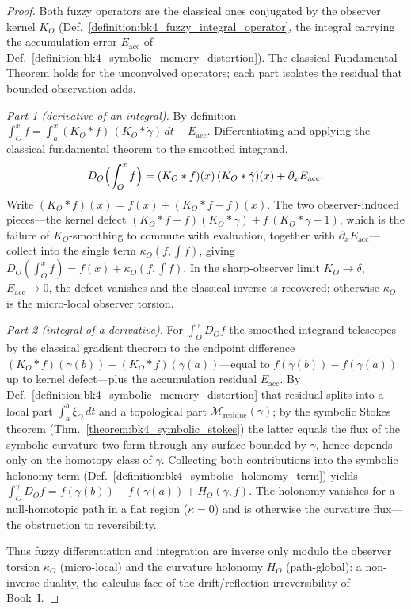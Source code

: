 \begin{proof}
\label{proof:bk4_fuzzy_fundamental}
\leavevmode
Both fuzzy operators are the classical ones conjugated by the observer kernel $K_O$ (Def.~\ref{definition:bk4_fuzzy_integral_operator}, the integral carrying the accumulation error $E_{\text{acc}}$ of Def.~\ref{definition:bk4_symbolic_memory_distortion}). The classical Fundamental Theorem holds for the unconvolved operators; each part isolates the residual that bounded observation adds.

\emph{Part 1 (derivative of an integral).} By definition $\int_O^x f = \int_a^x (K_O*f)\,(K_O*\dot\gamma)\,dt + E_{\text{acc}}$. Differentiating and applying the classical fundamental theorem to the smoothed integrand,
\[
D_O\Bigl(\int_O^x f\Bigr) = (K_O*f)(x)\,(K_O*\dot\gamma)(x) + \partial_x E_{\text{acc}}.
\]
Write $(K_O*f)(x) = f(x) + (K_O*f - f)(x)$. The two observer-induced pieces---the kernel defect $(K_O*f-f)(K_O*\dot\gamma) + f\,(K_O*\dot\gamma - 1)$, which is the failure of $K_O$-smoothing to commute with evaluation, together with $\partial_x E_{\text{acc}}$---collect into the single term $\kappa_O(f,\int f)$, giving $D_O(\int_O^x f) = f(x) + \kappa_O(f,\int f)$. In the sharp-observer limit $K_O \to \delta$, $E_{\text{acc}} \to 0$, the defect vanishes and the classical inverse is recovered; otherwise $\kappa_O$ is the micro-local observer torsion.

\emph{Part 2 (integral of a derivative).} For $\int_O^\gamma D_O f$ the smoothed integrand telescopes by the classical gradient theorem to the endpoint difference $(K_O*f)(\gamma(b)) - (K_O*f)(\gamma(a))$---equal to $f(\gamma(b)) - f(\gamma(a))$ up to kernel defect---plus the accumulation residual $E_{\text{acc}}$. By Def.~\ref{definition:bk4_symbolic_memory_distortion} that residual splits into a local part $\int_a^b \xi_O\,dt$ and a topological part $\mathcal{M}_{\text{residue}}(\gamma)$; by the symbolic Stokes theorem (Thm.~\ref{theorem:bk4_symbolic_stokes}) the latter equals the flux of the symbolic curvature two-form through any surface bounded by $\gamma$, hence depends only on the homotopy class of $\gamma$. Collecting both contributions into the symbolic holonomy term (Def.~\ref{definition:bk4_symbolic_holonomy_term}) yields $\int_O^\gamma D_O f = f(\gamma(b)) - f(\gamma(a)) + H_O(\gamma,f)$. The holonomy vanishes for a null-homotopic path in a flat region ($\kappa = 0$) and is otherwise the curvature flux---the obstruction to reversibility.

Thus fuzzy differentiation and integration are inverse only modulo the observer torsion $\kappa_O$ (micro-local) and the curvature holonomy $H_O$ (path-global): a non-inverse duality, the calculus face of the drift/reflection irreversibility of Book~I.
\end{proof}

